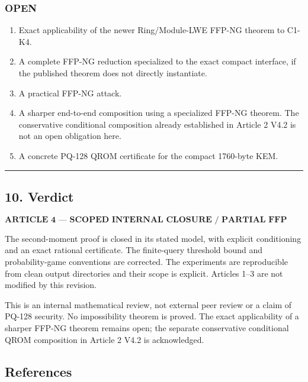 \documentclass[11pt,a4paper]{article}
\providecommand{\tightlist}{\setlength{\itemsep}{0pt}\setlength{\parskip}{0pt}}
\begin{document}
\subsubsection{OPEN}\label{open}

\begin{enumerate}
\def\labelenumi{\arabic{enumi}.}
\tightlist
\item
  Exact applicability of the newer Ring/Module-LWE FFP-NG theorem to C1-K4.
\item
  A complete FFP-NG reduction specialized to the exact compact interface, if the published theorem does not directly instantiate.
\item
  A practical FFP-NG attack.
\item
  A sharper end-to-end composition using a specialized FFP-NG theorem. The conservative conditional composition already established in Article 2 V4.2 is not an open obligation here.
\item
  A concrete PQ-128 QROM certificate for the compact 1760-byte KEM.
\end{enumerate}

\begin{center}\rule{0.5\linewidth}{0.5pt}\end{center}

\subsection{10. Verdict}\label{verdict}

\[
\boxed{
\textbf{ARTICLE 4 — SCOPED INTERNAL CLOSURE / PARTIAL FFP ANALYSIS}
}
\]

The second-moment proof is closed in its stated model, with explicit conditioning and an exact rational certificate. The finite-query threshold bound and probability-game conventions are corrected. The experiments are reproducible from clean output directories and their scope is explicit. Articles 1--3 are not modified by this revision.

This is an internal mathematical review, not external peer review or a claim of PQ-128 security. No impossibility theorem is proved. The exact applicability of a sharper FFP-NG theorem remains open; the separate conservative conditional QROM composition in Article 2 V4.2 is acknowledged.

\subsection{References}\label{references}
\end{document}
